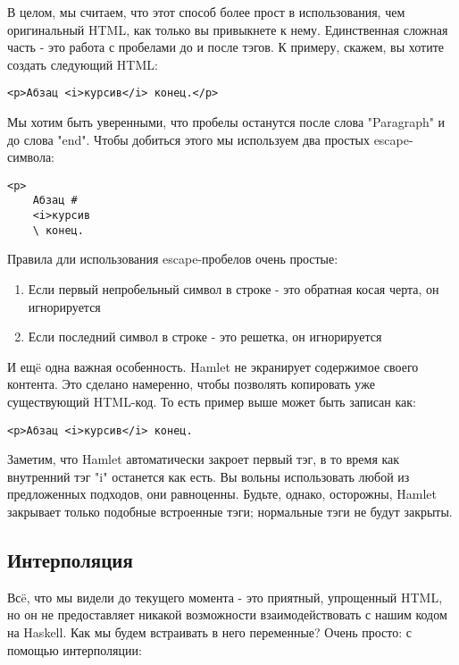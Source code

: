 В целом, мы считаем, что этот способ более прост в использования, чем 
оригинальный HTML, как только вы привыкнете к нему. Единственная сложная часть
 - это работа с пробелами до и после тэгов. К примеру, скажем, вы хотите
создать следующий HTML:

\begin{lstlisting}
<p>Абзац <i>курсив</i> конец.</p>
\end{lstlisting}

Мы хотим быть уверенными, что пробелы останутся после слова "Paragraph" и
до слова "end". Чтобы добиться этого мы используем два простых escape-символа:

\begin{lstlisting}
<p>                                                                             
    Абзац #
    <i>курсив                                                    
    \ конец.         
\end{lstlisting}

Правила дли использования escape-пробелов очень простые:
\begin{enumerate}
\item Если первый непробельный символ в строке - это обратная косая черта, 
он игнорируется
\item Если последний символ в строке - это решетка, он игнорируется
\end{enumerate}

И ещë одна важная особенность. Hamlet не экранирует содержимое своего контента.
Это сделано намеренно, чтобы позволять копировать уже существующий HTML-код.
То есть пример выше может быть записан как:
\begin{lstlisting}
<p>Абзац <i>курсив</i> конец.
\end{lstlisting}

Заметим, что Hamlet автоматически закроет первый тэг, в то время как внутренний
тэг "i" останется как есть. Вы вольны использовать любой из предложенных
подходов, они равноценны. Будьте, однако, осторожны, Hamlet закрывает только
подобные встроенные тэги; нормальные тэги не будут закрыты.

\subsection{Интерполяция}
Всë, что мы видели до текущего момента - это приятный, упрощенный HTML, но он
не предоставляет никакой возможности взаимодействовать с нашим кодом на Haskell.
Как мы будем встраивать в него переменные? Очень просто: с помощью интерполяции:

